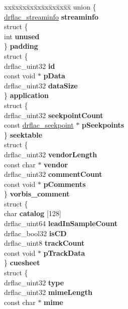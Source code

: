 \begin{DoxyCompactItemize}
\item 
\hypertarget{structdrflac__metadata_a9c2f48191ed5e54c7044f5b87bda8834}{\begin{tabbing}
xx\=xx\=xx\=xx\=xx\=xx\=xx\=xx\=xx\=\kill
union \{\\
\>\hyperlink{structdrflac__streaminfo}{drflac\_streaminfo} {\bfseries streaminfo}\\
\>struct \{\\
\>\>int {\bfseries unused}\\
\>\} {\bfseries padding}\\
\>struct \{\\
\>\>drflac\_uint32 {\bfseries id}\\
\>\>const void $\ast$ {\bfseries pData}\\
\>\>drflac\_uint32 {\bfseries dataSize}\\
\>\} {\bfseries application}\\
\>struct \{\\
\>\>drflac\_uint32 {\bfseries seekpointCount}\\
\>\>const \hyperlink{structdrflac__seekpoint}{drflac\_seekpoint} $\ast$ {\bfseries pSeekpoints}\\
\>\} {\bfseries seektable}\\
\>struct \{\\
\>\>drflac\_uint32 {\bfseries vendorLength}\\
\>\>const char $\ast$ {\bfseries vendor}\\
\>\>drflac\_uint32 {\bfseries commentCount}\\
\>\>const void $\ast$ {\bfseries pComments}\\
\>\} {\bfseries vorbis\_comment}\\
\>struct \{\\
\>\>char {\bfseries catalog} \mbox{[}128\mbox{]}\\
\>\>drflac\_uint64 {\bfseries leadInSampleCount}\\
\>\>drflac\_bool32 {\bfseries isCD}\\
\>\>drflac\_uint8 {\bfseries trackCount}\\
\>\>const void $\ast$ {\bfseries pTrackData}\\
\>\} {\bfseries cuesheet}\\
\>struct \{\\
\>\>drflac\_uint32 {\bfseries type}\\
\>\>drflac\_uint32 {\bfseries mimeLength}\\
\>\>const char $\ast$ {\bfseries mime}\\

\end{tabbing}}
\end{DoxyCompactItemize}
